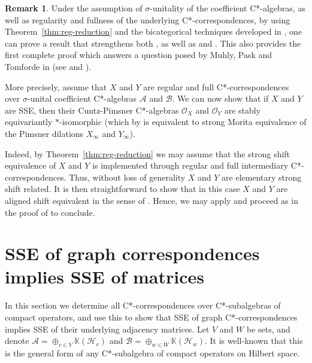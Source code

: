 \documentclass[11pt, letterpaper,final]{amsart}
\newcommand{\A}{{\mathcal{A}}}
\newcommand{\B}{{\mathcal{B}}}
\renewcommand{\H}{{\mathcal{H}}}
\newcommand{\bbK}{{\mathbb{K}}}
\theoremstyle{definition}
\newtheorem{rmk}[thm]{Remark}
\begin{document}
\begin{rmk} \label{rmk:equiv-stab-iso}
Under the assumption of $\sigma$-unitality of the coefficient C*-algebras, as well as regularity and fullness of the underlying C*-correspondences, by using Theorem~\ref{thm:reg-reduction} and the bicategorical techniques developed in \cite[Sections 4 and 5]{BDR+}, one can prove a result that strengthens both \cite[Theorem 7.1]{KK-JFA2014}, as well as \cite[Theorems~6.3 \& 6.7]{Ery22} and \cite[Theorem~3.5]{BMA}. This also provides the first complete proof which answers a question posed by Muhly, Pask and Tomforde in \cite[Remark 5.5]{MPT08} (see \cite[Conjecture 1]{KK-JFA2014} and \cite[Theorem 3.17]{CDE}).

More precisely, assume that $X$ and $Y$ are regular and full C*-correspondences over $\sigma$-unital coefficient C*-algebras $\A$ and $\B$. We can now show that if $X$ and $Y$ are SSE, then their Cuntz-Pimsner C*-algebras $\mathcal{O}_X$ and $\mathcal{O}_Y$ are stably equivariantly $*$-isomorphic (which by \cite[Theorem 3.17]{CDE} is equivalent to strong Morita equivalence of the Pimsner dilations $X_{\infty}$ and $Y_{\infty}$).

Indeed, by Theorem~\ref{thm:reg-reduction} we may assume that the strong shift equivalence of $X$ and $Y$ is implemented through regular and full intermediary C*-correspondences. Thus, without loss of generality $X$ and $Y$ are elementary strong shift related. It is then straightforward to show that in this case $X$ and $Y$ are aligned shift equivalent in the sense of \cite[Definition 3.1]{BDR+}. Hence, we may apply \cite[Theorem 4.5]{BDR+} and proceed as in the proof of \cite[Theorem 6.3]{BDR+} to conclude.
\end{rmk}


\section{SSE of graph correspondences implies SSE of matrices}\label{sec-modSSE-implies-SSE}

In this section we determine all C*-correspondences over C*-subalgebras of compact operators, and use this to show that SSE of graph C*-correspondences implies SSE of their underlying adjacency matrices. Let $V$ and $W$ be sets, and denote $\A = \oplus_{v \in V} \bbK(\H_v)$ and $\B = \oplus_{w\in W} \bbK(\H_w)$. It is well-known that this is the general form of any C*-subalgebra of compact operators on Hilbert space.
\end{document}
